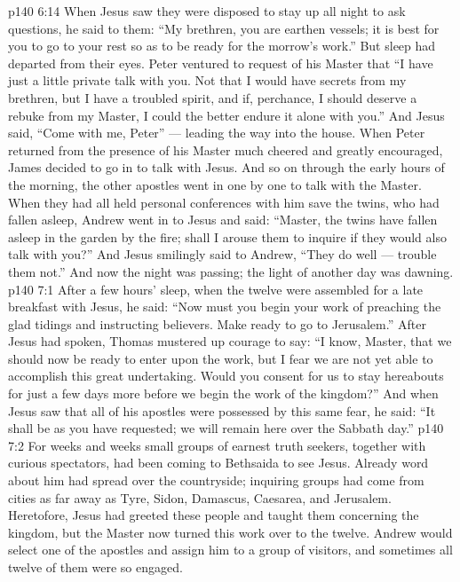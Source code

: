 \vs p140 6:14 When Jesus saw they were disposed to stay up all night to ask questions, he said to them: \textcolor{ubdarkred}{“My brethren, you are earthen vessels; it is best for you to go to your rest so as to be ready for the morrow’s work.”} But sleep had departed from their eyes. Peter ventured to request of his Master that “I have just a little private talk with you. Not that I would have secrets from my brethren, but I have a troubled spirit, and if, perchance, I should deserve a rebuke from my Master, I could the better endure it alone with you.” And Jesus said, \textcolor{ubdarkred}{“Come with me, Peter”} --- leading the way into the house. When Peter returned from the presence of his Master much cheered and greatly encouraged, James decided to go in to talk with Jesus. And so on through the early hours of the morning, the other apostles went in one by one to talk with the Master. When they had all held personal conferences with him save the twins, who had fallen asleep, Andrew went in to Jesus and said: “Master, the twins have fallen asleep in the garden by the fire; shall I arouse them to inquire if they would also talk with you?” And Jesus smilingly said to Andrew, \textcolor{ubdarkred}{“They do well --- trouble them not.”} And now the night was passing; the light of another day was dawning.
\vs p140 7:1 After a few hours’ sleep, when the twelve were assembled for a late breakfast with Jesus, he said: \textcolor{ubdarkred}{“Now must you begin your work of preaching the glad tidings and instructing believers. Make ready to go to Jerusalem.”} After Jesus had spoken, Thomas mustered up courage to say: “I know, Master, that we should now be ready to enter upon the work, but I fear we are not yet able to accomplish this great undertaking. Would you consent for us to stay hereabouts for just a few days more before we begin the work of the kingdom?” And when Jesus saw that all of his apostles were possessed by this same fear, he said: \textcolor{ubdarkred}{“It shall be as you have requested; we will remain here over the Sabbath day.”}
\vs p140 7:2 \pc For weeks and weeks small groups of earnest truth seekers, together with curious spectators, had been coming to Bethsaida to see Jesus. Already word about him had spread over the countryside; inquiring groups had come from cities as far away as Tyre, Sidon, Damascus, Caesarea, and Jerusalem. Heretofore, Jesus had greeted these people and taught them concerning the kingdom, but the Master now turned this work over to the twelve. Andrew would select one of the apostles and assign him to a group of visitors, and sometimes all twelve of them were so engaged.
